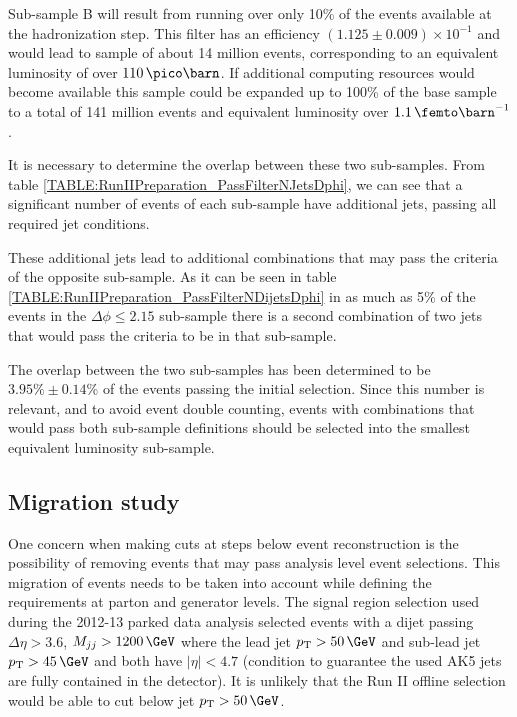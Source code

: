 Sub-sample B will result from running over only 10\% of the events available at the hadronization step. This filter has an efficiency $(1.125 \pm 0.009) \times 10^{-1}$  and would lead to sample of about 14 million events, corresponding to an equivalent luminosity of over $110\,\pico\barn$. If additional computing resources would become available this sample could be expanded up to 100\% of the base sample to a total of 141 million events and equivalent luminosity over $1.1\,\femto\barn^{-1}$.

It is necessary to determine the overlap between these two sub-samples. From table \ref{TABLE:RunIIPreparation_PassFilterNJetsDphi}, we can see that a significant number of events of each sub-sample have additional jets, passing all required jet conditions. 



These additional jets lead to additional combinations that may pass the criteria of the opposite sub-sample. As it can be seen in table \ref{TABLE:RunIIPreparation_PassFilterNDijetsDphi} in as much as 5\% of the events in the $\Delta\phi \leq 2.15$ sub-sample there is a second combination of two jets that would pass the criteria to be in that sub-sample.



The overlap between the two sub-samples has been determined to be $3.95\% \pm 0.14\%$ of the events passing the initial selection. Since this number is relevant, and to avoid event double counting, events with combinations that would pass both sub-sample definitions should be selected into the smallest equivalent luminosity sub-sample.

\subsection{Migration study}
\label{SUBSECTION:RunIIPreparation_MigrationStudy}


One concern when making cuts at steps below event reconstruction is the possibility of removing events that may pass analysis level event selections. This migration of events needs to be taken into account while defining the requirements at parton and generator levels. The signal region selection used during the 2012-13 parked data analysis selected events with a dijet passing $\Delta\eta>3.6$, $M_{jj}>1200\,\GeV$ where the lead jet $\pt > 50\,\GeV$ and sub-lead jet $\pt > 45\,\GeV$ and both have $|\eta|<4.7$ (condition to guarantee the used AK5 jets are fully contained in the detector). It is unlikely that the Run II offline selection would be able to cut below jet $\pt > 50\,\GeV$.

